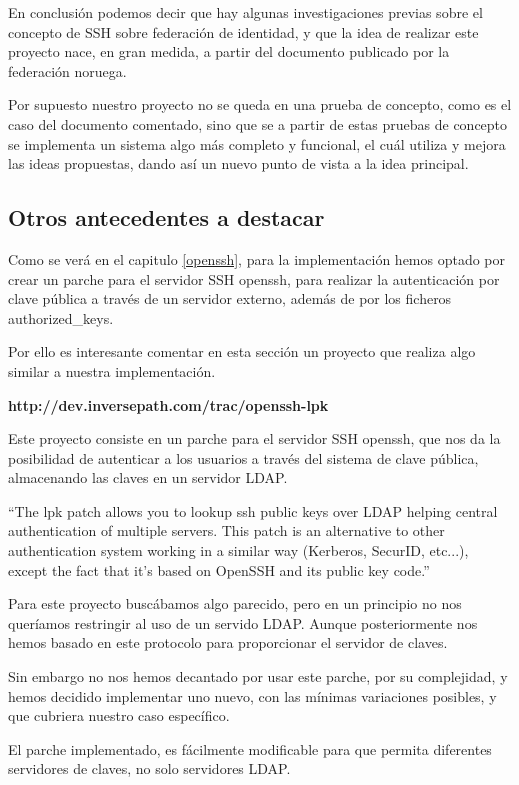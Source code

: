     En conclusión podemos decir que hay algunas investigaciones
    previas sobre el concepto de SSH sobre federación de identidad, y
    que la idea de realizar este proyecto nace, en gran medida, a
    partir del documento publicado por la federación noruega.
    
    Por supuesto nuestro proyecto no se queda en una prueba de
    concepto, como es el caso del documento comentado, sino que se a
    partir de estas pruebas de concepto se implementa un sistema algo
    más completo y funcional, el cuál utiliza y mejora las ideas
    propuestas, dando así un nuevo punto de vista a la idea principal.

    
    \subsection{Otros antecedentes a destacar}
    
        Como se verá en el capitulo \ref{openssh}, para la
        implementación hemos optado por crear un parche para el
        servidor SSH openssh, para realizar la autenticación por clave
        pública a través de un servidor externo, además de por los
        ficheros authorized\_keys.

        Por ello es interesante comentar en esta sección un proyecto
        que realiza algo similar a nuestra implementación.

        \textbf{http://dev.inversepath.com/trac/openssh-lpk}

        Este proyecto consiste en un parche para el servidor SSH
        openssh, que nos da la posibilidad de autenticar a los
        usuarios a través del sistema de clave pública, almacenando
        las claves en un servidor LDAP.

        ``The lpk patch allows you to lookup ssh public keys over LDAP
        helping central authentication of multiple servers. This patch
        is an alternative to other authentication system working in a
        similar way (Kerberos, SecurID, etc...), except the fact that
        it's based on OpenSSH and its public key code.''
        
        Para este proyecto buscábamos algo parecido, pero en un
        principio no nos queríamos restringir al uso de un servido
        LDAP. Aunque posteriormente nos hemos basado en este protocolo
        para proporcionar el servidor de claves.

        Sin embargo no nos hemos decantado por usar este parche, por
        su complejidad, y hemos decidido implementar uno nuevo, con
        las mínimas variaciones posibles, y que cubriera nuestro caso
        específico.

        El parche implementado, es fácilmente modificable para que
        permita diferentes servidores de claves, no solo servidores
        LDAP.
